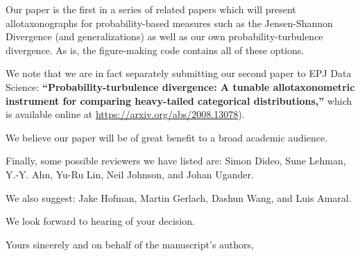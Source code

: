 Our paper is the first in a series of related papers which will
present allotaxonographs for probability-based measures such
as the Jensen-Shannon Divergence (and generalizations) as well
as our own probability-turbulence divergence.
As is, the figure-making code contains all of these options.

We note that we are in fact separately submitting our
second paper to EPJ Data Science:
\textbf{``Probability-turbulence divergence: A tunable
allotaxonometric instrument for comparing
heavy-tailed categorical distributions,''}
which is available online at \url{https://arxiv.org/abs/2008.13078}).




We believe our paper will be of great benefit to a broad academic audience.

Finally, some possible reviewers we have listed are:
Simon Dideo,
Sune Lehman,
Y.-Y. Ahn,
Yu-Ru Lin,
Neil Johnson,
and
Johan Ugander.

We also suggest:
Jake Hofman,
Martin Gerlach,
Dashun Wang,
and
Luis Amaral.

We look forward to hearing of your decision.

\bigskip
\bigskip

Yours sincerely and on behalf of the manuscript's authors,


